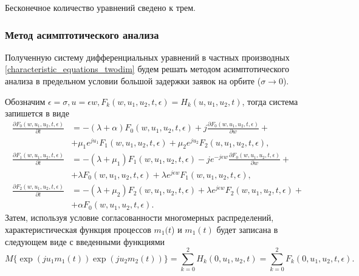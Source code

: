 Бесконечное количество уравнений сведено к трем.

\subsubsection{Метод асимптотического анализа}
Полученную систему дифференциальных уравнений в частных производных  \eqref{characteristic_equations_twodim} будем решать методом асимптотического анализа в предельном условии большой задержки заявок на орбите ($\sigma \xrightarrow{} 0$).

Обозначим $\epsilon = \sigma,   u= \epsilon w,   F_{k}(w,u_{1},u_{2},t,\epsilon) = H_{k}(u,u_{1},u_{2},t)$, тогда система запишется в виде
\begin{equation} \label{asymptotic_equations_twodim}
	\begin{split}
		\frac{{\partial F_{0}(w,u_{1},u_{2},t,\epsilon)}}{{\partial t}} &= -(\lambda + \alpha)F_{0}(w,u_{1},u_{2},t,\epsilon) + j
		\frac{{\partial F_{0}(w,u_{1},u_{2},t,\epsilon)}}{{\partial w}} +\\  &+ \mu_{1} e^{ju_{1}}F_{1}(w,u_{1},u_{2},t,\epsilon) + \mu_{2}e^{ju_{2}}F_{2}(u,u_{1},u_{2},t,\epsilon) ,
		\\
		\frac{{\partial F_{1}(w,u_{1},u_{2},t,\epsilon)}}{{\partial t}} &= -(\lambda + \mu_{1})F_{1}(w,u_{1},u_{2},t,\epsilon) - j e^{-j\epsilon w}
		\frac{{\partial F_{0}(w,u_{1},u_{2},t,\epsilon)}}{{\partial w}} +\\  &+ \lambda F_{0}(w,u_{1},u_{2},t,\epsilon) + \lambda e^{j\epsilon w}F_{1}(w,u_{1},u_{2},t,\epsilon) ,
		\\
		\frac{{\partial F_{2}(w,u_{1},u_{2},t,\epsilon)}}{{\partial t}} &= -(\lambda + \mu_{2})F_{2}(w,u_{1},u_{2},t,\epsilon)  + \lambda e^{j\epsilon w}F_{2}(w,u_{1},u_{2},t,\epsilon) +\\  &+ \alpha F_{0}(w,u_{1},u_{2},t,\epsilon).
	\end{split}
\end{equation} 
Затем, используя условие согласованности многомерных распределений, характеристическая функция процессов $m_{1}(t$) и $m_{1}(t)$ будет записана в следующем виде с введенными функциями 
\begin{equation*}
	M\{\exp(ju_{1}m_{1}(t))\exp(ju_{2}m_{2}(t))\}=\sum_{k=0}^{2}H_{k}(0,u_{1},u_{2},t) = \sum_{k=0}^{2}F_{k}(0,u_{1},u_{2},t,\epsilon).
\end{equation*}

